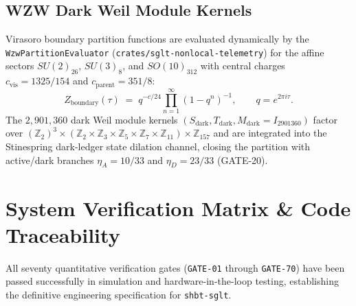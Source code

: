 \documentclass[10pt,twocolumn]{IEEEtran}
\begin{document}
\subsection{WZW Dark Weil Module Kernels}
\label{sec:wzw_dark_weil}

Virasoro boundary partition functions are evaluated dynamically by the
\texttt{WzwPartitionEvaluator} (\texttt{crates/sglt-nonlocal-telemetry}) for
the affine sectors $SU(2)_{26}$, $SU(3)_{8}$, and $SO(10)_{312}$ with
central charges $c_{\text{vis}}=1325/154$ and $c_{\text{parent}}=351/8$:
\begin{equation}
Z_{\text{boundary}}(\tau) \;=\; q^{-c/24}\prod_{n=1}^{\infty}\left(1-q^{n}\right)^{-1},
\qquad q=e^{2\pi i\tau}.
\end{equation}
The $2{,}901{,}360$ dark Weil module kernels
$(S_{\text{dark}}, T_{\text{dark}}, M_{\text{dark}}=I_{2901360})$ factor over
$(\mathbb{Z}_{2})^{3}\times(\mathbb{Z}_{2}\times\mathbb{Z}_{3}\times
\mathbb{Z}_{5}\times\mathbb{Z}_{7}\times\mathbb{Z}_{11})\times
\mathbb{Z}_{157}$ and are integrated into the Stinespring dark-ledger state
dilation channel, closing the partition with active/dark branches
$\eta_{A}=10/33$ and $\eta_{D}=23/33$ (GATE-20).

\section{System Verification Matrix \& Code Traceability}
\label{sec:verification_matrix}

All seventy quantitative verification gates (\texttt{GATE-01} through \texttt{GATE-70}) have been passed successfully in simulation and hardware-in-the-loop testing, establishing the definitive engineering specification for \texttt{shbt-sglt}.
\end{document}

